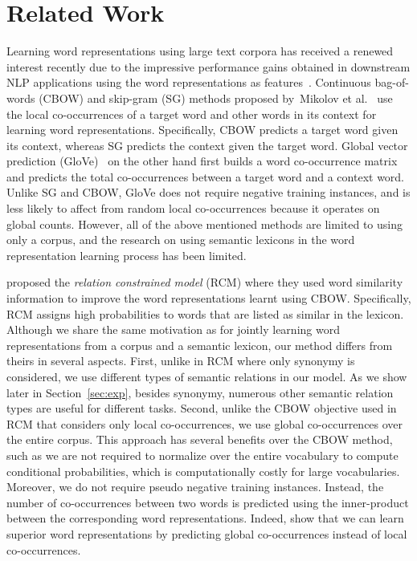\documentclass[letterpaper]{article}
\newcommand{\citet}[1]{\citeauthor{#1} \shortcite{#1}}
\begin{document}
\section{Related Work}
\label{sec:related}



Learning word representations using large text corpora has received a renewed interest recently due to the
impressive performance gains obtained in downstream NLP applications using the word representations as features~\cite{Collobert:2011,Turian:ACL:2010}.
Continuous bag-of-words (CBOW)  and skip-gram (SG) methods proposed by~Mikolov et al.~\cite{Milkov:2013}
use the local co-occurrences of a target word and other words in its context for learning word representations.
Specifically, CBOW predicts a target word given its context, whereas SG predicts the context given the target word.
Global vector prediction (GloVe)~\cite{Pennington:EMNLP:2014} on the other hand first builds a word co-occurrence
matrix and predicts the total co-occurrences between a target word and a context word.
Unlike SG and CBOW, GloVe does not require negative training instances, and is less likely to affect from random local
co-occurrences because it operates on global counts.
However, all of the above mentioned methods are limited to using only a corpus, and
the research on using semantic lexicons in the word representation learning process has been limited.

\citet{Yu:ACL:2014} proposed the \emph{relation constrained model} (RCM) where they used word similarity information to improve the word representations learnt using CBOW. Specifically, RCM assigns high probabilities to words that are listed as similar in the lexicon.
Although we share the same motivation as \citet{Yu:ACL:2014} for jointly learning word representations from a corpus and
a semantic lexicon, our method differs from theirs in several aspects.
First, unlike in RCM where only synonymy is considered, we use different types of semantic relations in our model.
As we show later in Section~\ref{sec:exp}, besides synonymy, numerous other semantic relation types are useful for different tasks.
Second, unlike the CBOW objective used in RCM that considers only local co-occurrences, we use
global co-occurrences over the entire corpus. This approach has several benefits over the CBOW method, such as
we are not required to normalize over the entire vocabulary to compute conditional probabilities, which is computationally
costly for large vocabularies. Moreover, we do not require pseudo negative training instances. Instead, the number of
co-occurrences between two words is predicted using the inner-product between the corresponding word representations.
Indeed, \citet{Pennington:EMNLP:2014} show that we can learn superior word representations by predicting global co-occurrences
instead of local co-occurrences.
\end{document}
